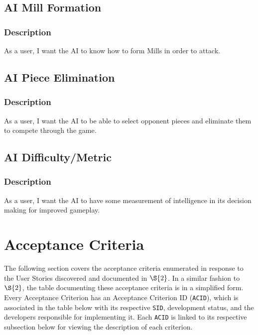 \documentclass[11pt]{article}
\begin{document}
\subsection{AI Mill Formation}
\label{sec:orga31eb98}
\subsubsection*{Description}
\label{sec:orgaf3997a}
As a user, I want the AI to know how to form Mills in order to attack.

\subsection{AI Piece Elimination}
\label{sec:org589ee2d}
\subsubsection*{Description}
\label{sec:org4eccc60}
As a user, I want the AI to be able to select opponent pieces and eliminate them to compete
through the game.
\subsection{AI Difficulty/Metric}
\label{sec:org4e32353}
\subsubsection*{Description}
\label{sec:orgabac74d}
As a user, I want the AI to have some measurement of intelligence in its decision making for
improved gameplay.

\section{Acceptance Criteria}
\label{sec:org6d3a5eb}
The following section covers the acceptance criteria enumerated in response to the User Stories
discovered and documented in \hyperref[sec:org4875ede]{\(\S{2}\)}. In a similar fashion to \(\S{2}\), the table documenting these
acceptance criteria is in a simplified form. Every Acceptance Criterion has an Acceptance
Criterion ID (\texttt{ACID}), which is associated in the table below with its respective \texttt{SID}, development
status, and the developers responsible for implementing it. Each \texttt{ACID} is linked to its respective
subsection below for viewing the description of each criterion.
\end{document}

